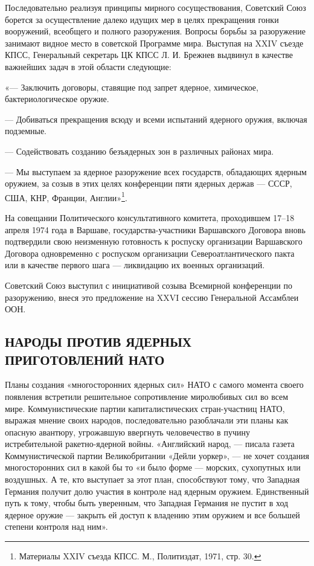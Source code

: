 \documentclass[12pt, a4paper, openany]{book}
\begin{document}
	Последовательно реализуя принципы мирного сосуществования, Советский Союз борется за осуществление далеко идущих мер в целях прекращения гонки вооружений, всеобщего и полного разоружения. Вопросы борьбы за разоружение занимают видное место в советской Программе мира. Выступая на XXIV съезде КПСС, Генеральный секретарь ЦК КПСС Л. И. Брежнев выдвинул в качестве важнейших задач в этой области следующие:
	
	«— Заключить договоры, ставящие под запрет ядерное, химическое, бактериологическое оружие.
	
	— Добиваться прекращения всюду и всеми испытаний ядерного оружия, включая подземные.
	
	— Содействовать созданию безъядерных зон в различных районах мира.
	
	— Мы выступаем за ядерное разоружение всех государств, обладающих ядерным оружием, за созыв в этих целях конференции пяти ядерных держав — СССР, США, КНР, Франции, Англии»{\footnote{Материалы XXIV съезда КПСС. М., Политиздат, 1971, стр. 30.}}.
	
	
	На совещании Политического консультативного комитета, проходившем 17–18 апреля 1974 года в Варшаве, государства-участники Варшавского Договора вновь подтвердили свою неизменную готовность к роспуску организации Варшавского Договора одновременно с роспуском организации Североатлантического пакта или в качестве первого шага — ликвидацию их военных организаций.
	
	Советский Союз выступил с инициативой созыва Всемирной конференции по разоружению, внеся это предложение на XXVI сессию Генеральной Ассамблеи ООН.
	
		\subsection[Народы против ядерных приготовлений НАТО]{\center НАРОДЫ ПРОТИВ ЯДЕРНЫХ ПРИГОТОВЛЕНИЙ НАТО}	
	
	
	Планы создания «многосторонних ядерных сил» НАТО с самого момента своего появления встретили решительное сопротивление миролюбивых сил во всем мире. Коммунистические партии капиталистических стран-участниц НАТО, выражая мнение своих народов, последовательно разоблачали эти планы как опасную авантюру, угрожавшую ввергнуть человечество в пучину истребительной ракетно-ядерной войны. «Английский народ, — писала газета Коммунистической партии Великобритании «Дейли уоркер», — не хочет создания многосторонних сил в какой бы то «и было форме — морских, сухопутных или воздушных. А те, кто выступает за этот план, способствуют тому, что Западная Германия получит долю участия в контроле над ядерным оружием. Единственный путь к тому, чтобы быть уверенным, что Западная Германия не пустит в ход ядерное оружие — закрыть ей доступ к владению этим оружием и все большей степени контроля над ним».
	
\end{document}
